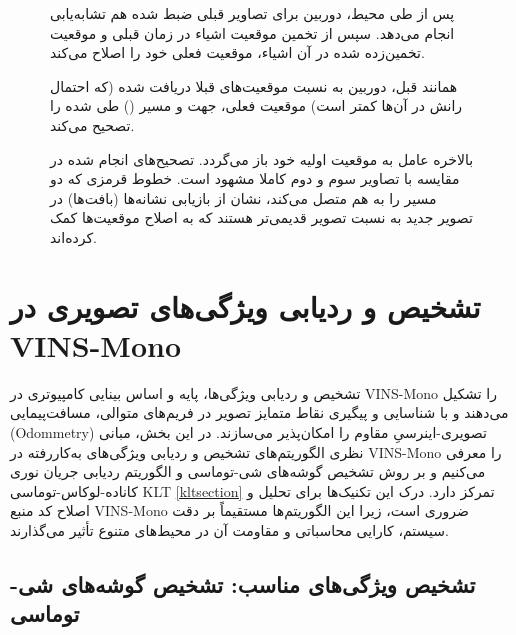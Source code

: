 \documentclass[11pt, a4paper]{article}
\begin{document}
	
	\begin{figure}[H]
		\centering
		\caption[بازیابی موقعیتی که قبلا در دنباله مشاهده شده]{
			پس از طی محیط، دوربین برای تصاویر قبلی ضبط شده هم تشابه‌یابی انجام می‌دهد. سپس از تخمین موقعیت اشیاء در زمان قبلی و موقعیت تخمین‌زده شده در آن اشیاء، موقعیت فعلی خود را اصلاح می‌کند.
		}
		\label{fig:mono3}
	\end{figure}	
	
	
	\begin{figure}[H]
		\centering
		\caption[تصحیح خطا به نسبت موقعیت‌های پیشین]{
			همانند قبل، دوربین به نسبت موقعیت‌های قبلا دریافت شده (که احتمال رانش در آن‌ها کمتر است) موقعیت فعلی، جهت و مسیر 
			()  طی شده را تصحیح می‌کند.
		}
		\label{fig:mono4}
	\end{figure}	
	
	\begin{figure}[H]
		\centering
		\caption[بازگشت به موقعیت اولیه و اصلاح‌های انجام شده در مسیر]{
			بالاخره عامل به موقعیت اولیه خود باز می‌گردد. تصحیح‌های انجام شده در مقایسه با تصاویر 
			سوم و دوم کاملا مشهود است. 
			خطوط قرمزی که دو مسیر را به هم متصل می‌کند، نشان از بازیابی نشانه‌ها (بافت‌ها) در تصویر جدید به نسبت تصویر قدیمی‌تر هستند که به اصلاح موقعیت‌ها کمک کرده‌اند.
		}
		\label{fig:mono5}
	\end{figure}	
	
	
	
	
	
	\section{تشخیص و ردیابی ویژگی‌های تصویری در VINS-Mono}
	
	تشخیص و ردیابی ویژگی‌ها، پایه و اساس بینایی کامپیوتری در VINS-Mono را تشکیل می‌دهند و با شناسایی و پیگیری نقاط متمایز تصویر در فریم‌های متوالی، مسافت‌پیمایی 
	(Odommetry)
	تصویری-اینرسیِ مقاوم را امکان‌پذیر می‌سازند. در این بخش، مبانی نظری الگوریتم‌های تشخیص و ردیابی ویژگی‌های به‌کاررفته در VINS-Mono را معرفی می‌کنیم و بر روش تشخیص گوشه‌های شی-توماسی و الگوریتم ردیابی جریان نوری کاناده-لوکاس-توماسی 
	\gls{KLT} \ref{kltsection}
	تمرکز دارد. درک این تکنیک‌ها برای تحلیل و اصلاح کد منبع VINS-Mono ضروری است، زیرا این الگوریتم‌ها مستقیماً بر دقت سیستم، کارایی محاسباتی و مقاومت آن در محیط‌های متنوع تأثیر می‌گذارند.
	
	\subsection{تشخیص ویژگی‌های مناسب: تشخیص گوشه‌های شی-توماسی}
	
\end{document}
